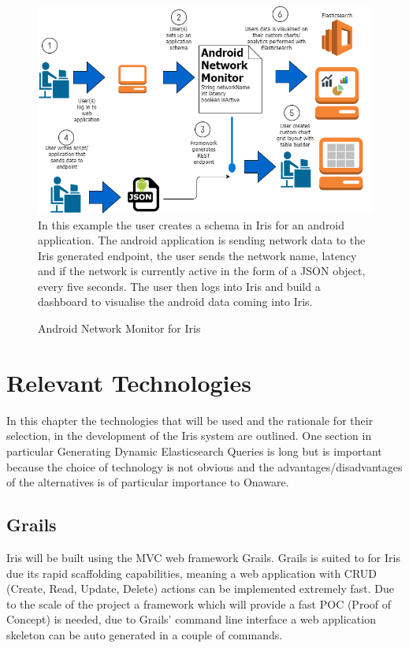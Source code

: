 \documentclass[12pt,a4paper,titlepage]{report}
\begin{document}
\begin{figure}[H]
\begin{tcolorbox}
\includegraphics[width=\textwidth,height=\textheight,keepaspectratio]{dynamic_performance_framework_android_flow}
In this example the user creates a schema in Iris for an android application. The android application is sending network data to the Iris generated endpoint, the user sends the network name, latency and if the network is currently active in the form of a JSON object, every five seconds. The user then logs into Iris and build a dashboard to visualise the android data coming into Iris.
\end{tcolorbox}
\caption{Android Network Monitor for Iris}
\end{figure}

\chapter{Relevant Technologies}

In this chapter the technologies that will be used and the rationale for their selection, in the development of the Iris system are outlined. One section in particular Generating Dynamic Elasticsearch Queries is long but is important because the choice of technology is not obvious and the advantages/disadvantages of the alternatives is of particular importance to Onaware.

\section{Grails}

Iris will be built using the MVC web framework Grails. Grails is suited to for Iris due its rapid scaffolding capabilities, meaning a web application with CRUD (Create, Read, Update, Delete) actions can be implemented extremely fast. Due to the scale of the project a framework which will provide a fast POC (Proof of Concept) is needed, due to Grails’ command line interface a web application skeleton can be auto generated in a couple of commands. 
\end{document}
